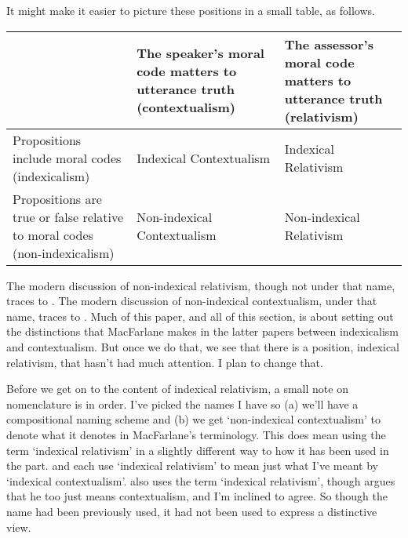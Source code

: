 \noindent It might make it easier to picture these positions in a small table, as follows.

\medskip
\begin{raggedright}
\begin{supertabular}{m{0.29\textwidth} | m{0.29\textwidth} | m{0.29\textwidth}}
~ & The speaker's moral code matters to utterance truth \newline
(contextualism) &
The assessor's moral  code matters to utterance truth \newline
(relativism) \tabularnewline \hline
Propositions include  moral codes \newline
(indexicalism) &
 Indexical
Contextualism &
 Indexical
Relativism \tabularnewline \hline
Propositions are true or false relative to moral codes \newline
 (non-indexicalism) &
 Non-indexical
Contextualism &
 Non-indexical \newline
Relativism \tabularnewline
\end{supertabular}
\end{raggedright}
\medskip

\noindent The modern discussion of non-indexical relativism, though not under that name, traces to \citet{MacFarlane2003-MACFCA-2}. The modern discussion of non-indexical contextualism, under that name, traces to \citet{MacFarlane2007-SMNIC, MacFarlane2009-MACNC}. Much of this paper, and all of this section, is about setting out the distinctions that MacFarlane makes in the latter papers between indexicalism and contextualism. But once we do that, we see that there is a position, indexical relativism, that hasn't had much attention. I plan to change that.

Before we get on to the content of indexical relativism, a small note on nomenclature is in order. I've picked the names I have so (a) we'll have a compositional naming scheme and (b) we get `non-indexical contextualism' to denote what it denotes in MacFarlane's terminology. This does mean using the term `indexical relativism' in a slightly different way to how it has been used in the part. \citet{Einheuser2008} and \citet{LopezDeSaMs} each use `indexical relativism' to mean just what I've meant by `indexical contextualism'. \citet{Kolbel2004} also uses the term `indexical relativism', though \citet{LopezDeSa2007a} argues that he too just means contextualism, and I'm inclined to agree. So though the name had been previously used, it had not been used to express a distinctive view.

